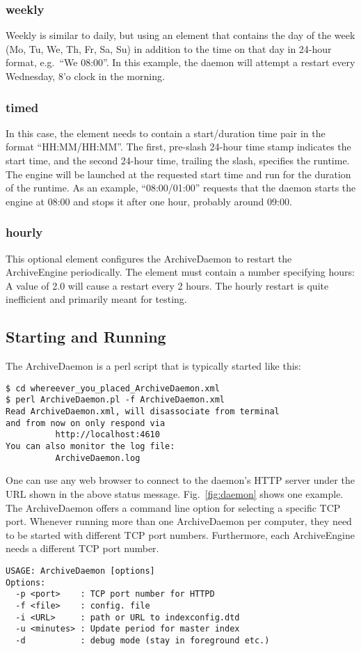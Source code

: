\subsubsection{weekly}
Weekly is similar to daily, but using an element that contains the day
of the week (Mo, Tu,  We, Th, Fr, Sa, Su) in addition to the time
on that day in 24-hour format, e.g.\ ``We 08:00''. In this example,
the daemon will attempt a restart every Wednesday, 8'o clock in the morning.

\subsubsection{timed}
In this case, the element needs to contain a start/duration time pair
in the format ``HH:MM/HH:MM''. The first, pre-slash 24-hour time stamp
indicates the start time, and the second 24-hour time, trailing the
slash, specifies the runtime. The engine will be launched at the
requested start time and run for the duration of the runtime. As an
example, ``08:00/01:00'' requests that the daemon starts the engine at
08:00 and stops it after one hour, probably around 09:00.

\subsubsection{hourly}
This optional element configures the ArchiveDaemon to restart the
ArchiveEngine periodically. The element must contain a number
specifying hours: A value of 2.0 will cause a restart every 2
hours. The hourly restart is quite inefficient and primarily meant for testing.

\subsection{Starting and Running}
The ArchiveDaemon is a perl script that is typically started like this:

\begin{lstlisting}[keywordstyle=\sffamily]
$ cd whereever_you_placed_ArchiveDaemon.xml
$ perl ArchiveDaemon.pl -f ArchiveDaemon.xml
Read ArchiveDaemon.xml, will disassociate from terminal
and from now on only respond via
          http://localhost:4610
You can also monitor the log file:
          ArchiveDaemon.log
\end{lstlisting}

\noindent One can use any web browser to connect to the daemon's HTTP server
under the URL shown in the above status message. Fig.~\ref{fig:daemon}
shows one example. The ArchiveDaemon offers a command line option for
selecting a specific TCP port.
Whenever running more than one ArchiveDaemon per computer, they
need to be started with different TCP port numbers. Furthermore, each
ArchiveEngine needs a different TCP port number.
\begin{lstlisting}[keywordstyle=\sffamily]
USAGE: ArchiveDaemon [options] 
Options:
  -p <port>    : TCP port number for HTTPD
  -f <file>    : config. file
  -i <URL>     : path or URL to indexconfig.dtd
  -u <minutes> : Update period for master index
  -d           : debug mode (stay in foreground etc.)
\end{lstlisting}

